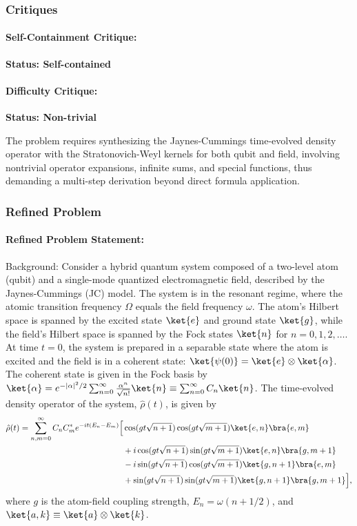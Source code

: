 \documentclass[10pt]{article}
\begin{document}
\subsubsection*{Critiques}
\paragraph*{Self-Containment Critique:}
\textcolor{pass}{\textbf{Status: Self-contained}}




\paragraph*{Difficulty Critique:}
\textcolor{pass}{\textbf{Status: Non-trivial}}

The problem requires synthesizing the Jaynes-Cummings time-evolved density operator with the Stratonovich-Weyl kernels for both qubit and field, involving nontrivial operator expansions, infinite sums, and special functions, thus demanding a multi-step derivation beyond direct formula application.


\subsubsection*{Refined Problem}
\paragraph*{Refined Problem Statement:}
Background: 
Consider a hybrid quantum system composed of a two-level atom (qubit) and a single-mode quantized electromagnetic field, described by the Jaynes-Cummings (JC) model. The system is in the resonant regime, where the atomic transition frequency $\Omega$ equals the field frequency $\omega$. The atom's Hilbert space is spanned by the excited state $\ket{e}$ and ground state $\ket{g}$, while the field's Hilbert space is spanned by the Fock states $\ket{n}$ for $n=0, 1, 2, \dots$. At time $t=0$, the system is prepared in a separable state where the atom is excited and the field is in a coherent state: $\ket{\psi(0)} = \ket{e} \otimes \ket{\alpha}$. The coherent state is given in the Fock basis by $\ket{\alpha} = e^{-\left|\alpha\right|^2/2} \sum_{n=0}^{\infty} \frac{\alpha^n}{\sqrt{n!}} \ket{n} \equiv \sum_{n=0}^{\infty} C_n \ket{n}$. The time-evolved density operator of the system, $\hat{\rho}(t)$, is given by
\begin{align*}
\hat{\rho}(t) = \sum_{n,m=0}^{\infty} C_n C_m^* e^{-i t (E_n - E_m)} \Big[ & \cos(gt\sqrt{n+1}) \cos(gt\sqrt{m+1}) \ket{e,n}\bra{e,m} \\
& + i \cos(gt\sqrt{n+1}) \sin(gt\sqrt{m+1}) \ket{e,n}\bra{g,m+1} \\
& - i \sin(gt\sqrt{n+1}) \cos(gt\sqrt{m+1}) \ket{g,n+1}\bra{e,m} \\
& + \sin(gt\sqrt{n+1}) \sin(gt\sqrt{m+1}) \ket{g,n+1}\bra{g,m+1} \Big],
\end{align*}
where $g$ is the atom-field coupling strength, $E_n = \omega(n+1/2)$, and $\ket{a,k} \equiv \ket{a} \otimes \ket{k}$.
\end{document}

